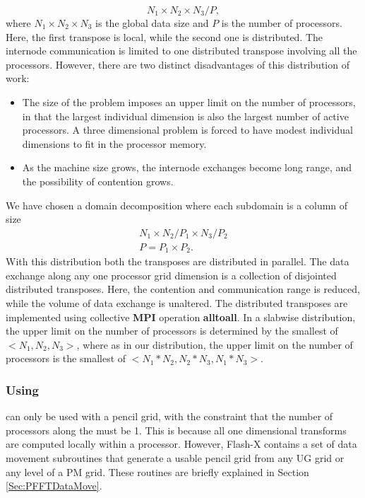 \begin {equation}\label {Eqn:Pfft_slab}
 N_1 \times N_2 \times N_3/P, 
\end {equation} 
where $N_1 \times N_2 \times N_3$ is the  global data size and $P$ is
the number of processors. Here, the first transpose is local, while
the second one is distributed. The internode communication is limited
to one distributed transpose involving all the processors. However,
there are two distinct disadvantages of this distribution  of work: 
\begin {itemize}
\item  The size of the problem imposes an upper limit on the number of 
processors, in that the largest individual dimension is also the
largest number of active processors. A three dimensional problem
is forced to  have modest individual dimensions to fit in the
processor memory.
\item As the machine size grows, the internode exchanges become long
range, and the possibility of contention grows.
\end {itemize}
We have chosen a domain decomposition where each subdomain is a column
of size \begin {eqnarray} \label {Eqn:Pfft_col}
N_1 \times N_2/P_1 \times N_3/P_2 \\ 
P = P_1 \times P_2. \nonumber
\end {eqnarray} 
With this distribution both the transposes are distributed in
parallel. The data exchange along any one processor grid dimension is
a collection of disjointed distributed transposes. Here, the
contention and communication range is reduced, while the volume of
data exchange is unaltered.  The distributed transposes are
implemented using collective {\bf MPI} operation {\bf alltoall}. In a
slabwise distribution, the upper limit on the number of processors is
determined by the smallest of $<N_1,N_2,N_3>$, where as in our
distribution, the upper limit on the number of processors is the
smallest of $<N_1*N_2,N_2*N_3,N_1*N_3>$. 

\subsubsection{Using }
\label{Sec:GridSolversUsingPfft}
 can only be used with a pencil grid, with the constraint
that the number of processors along the  must be 1. This
is because all one dimensional transforms are computed locally within
a processor.  However, Flash-X contains a set of data
movement subroutines that generate a usable pencil grid from any UG
grid or any level of a PM grid.  These routines are briefly explained
in Section \ref{Sec:PFFTDataMove}.

